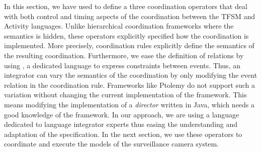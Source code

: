 In this section, we have used \bcool to define a three coordination operators that deal with both control and timing aspects of the coordination between the TFSM and Activity languages. Unlike hierarchical coordination frameworks where the semantics is hidden, these operators explicitly specified how the coordination is implemented. More precisely, coordination rules explicitly define the semantics of the resulting coordination. Furthermore, we ease the definition of relations by using \moccml, a dedicated language to express constraints between events. Thus, an integrator can vary the semantics of the coordination by only modifying the event relation in the coordination rule. Frameworks like Ptolemy do not support such a variation without changing the current implementation of the framework. This means modifying the implementation of a \emph{director} written in Java, which needs a good knowledge of the framework. In our approach, we are using a language dedicated to language integrator experts thus easing the understanding and adaptation of the \bcool specification. In the next section, we use these operators to coordinate and execute the models of the surveillance camera system.
	 


  




















